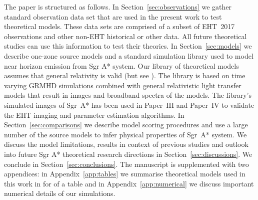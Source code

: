 The paper is structured as follows. In Section~\ref{sec:observations} we gather standard observation data set that are used in the present work to test theoretical models. These data sets are comprised of a subset of EHT~2017 observations and other non-EHT historical or other data. All future theoretical studies can use this information to test their theories. In Section~\ref{sec:models} we describe one-zone source models and a standard simulation library used to model near horizon emission from Sgr A* system. Our library of theoretical models assumes that general relativity is valid (but see \citealt{2010ApJ...718..446J, 2014ApJ...784....7B,
  2015ApJ...802...63B, 2015ApJ...814..115P, 2016ApJ...818..121P,
  2016PhRvL.117i1101J, 2019GReGr..51..137P}). The library is based on time varying GRMHD simulations combined with general relativistic light transfer models that result in images and broadband spectra of the models. The library's simulated images of Sgr~A* has been used in Paper~III and Paper~IV to validate the EHT imaging and parameter estimation algorithms. 
In Section~\ref{sec:comparisons} we describe model scoring procedures and use a large number of the source models to infer physical properties of Sgr~A* system. We discuss the model limitations, results in context of previous studies and outlook into future Sgr A* theoretical research directions in Section~\ref{sec:discussions}. We conclude in Section~\ref{sec:conclusions}. 
The manuscript is supplemented with two appendices: in Appendix~\ref{app:tables} we summarise theoretical models used in this work in for of a table and in Appendix~\ref{app:numerical} we discuss important numerical details of our simulations.



